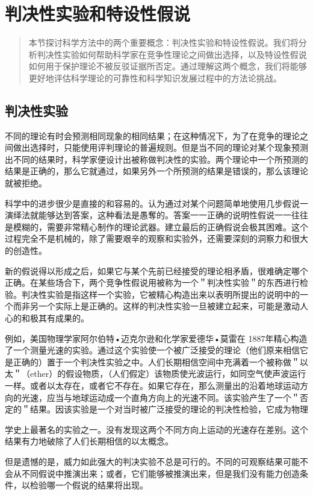\section{判决性实验和特设性假说}

\begin{quotation}
本节探讨科学方法中的两个重要概念：判决性实验和特设性假说。我们将分析判决性实验如何帮助科学家在竞争性理论之间做出选择，以及特设性假说如何用于保护理论不被反驳证据所否定。通过理解这两个概念，我们将能够更好地评估科学理论的可靠性和科学知识发展过程中的方法论挑战。
\end{quotation}

\subsection{判决性实验}
不同的理论有时会预测相同现象的相同结果；在这种情况下，为了在竞争的理论之间做出选择时，只能使用评判理论的普遍规则。但是当不同的理论对某个现象预测出不同的结果时，科学家便设计出被称做判决性的实验。两个理论中一个所预测的结果是正确的，那么它就通过，如果另外一个所预测的结果是错误的，那么该理论就被拒绝。

科学中的进步很少是直接的和容易的。认为通过对某个问题简单地使用几步假说一演绎法就能够达到答案，这种看法是愚奪的。答案一一正确的说明性假说一一往往是模糊的，需要非常精心制作的理论武器。建立最后的正确假说会极其困难。这个过程完全不是机械的，除了需要艰辛的观察和实验外，还需要深刻的洞察力和很大的创造性。

新的假说得以形成之后，如果它与某个先前已经接受的理论相矛盾，很难确定哪个正确。在某些场合下，两个竞争性假说用被称为一个＂判决性实验＂的东西进行检验。判决性实验是指这样一个实验，它被精心构造出来以表明所提出的说明中的一个而非另一个实际上是正确的。这样的判决性实验一旦被建立起来，可能是激动人心的和极其有成果的。

例如，美国物理学家阿尔伯特•迈克尔逊和化学家爱德华•莫雷在 1887年精心构造了一个测量光速的实验。通过这个实验使一个被广泛接受的理论（他们原来相信它是正确的）置于一个判决性实验之中。人们长期相信空间中充满着一个被称做＂以太＂（ether）的假设物质，（人们假定）该物质使光波运行，如同空气使声波运行一样。或者以太存在，或者它不存在。如果它存在，那么测量出的沿着地球运动方向的光速，应当与地球运动成一个直角方向上的光速不同。该实验产生了一个＂否定的＂结果。因该实验是一个对当时被广泛接受的理论的判决性检验，它成为物理

学史上最著名的实验之一。没有发现这两个不同方向上运动的光速存在差别。这个结果有力地破除了人们长期相信的以太概念。\cite{miller1981}

但是遗憾的是，威力如此强大的判决实验不总是可行的。不同的可观察结果可能不会从不同假说中推演出来；或者，它们能够被推演出来，但是我们没有能力创造条件，以检验哪一个假说的结果将出现。

